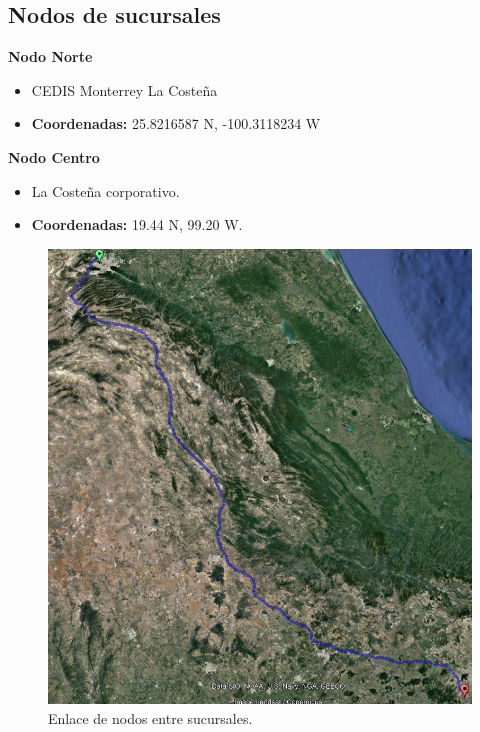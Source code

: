 \documentclass[12pt,letterpaper]{article}
\begin{document}
\newpage
\subsection{Nodos de sucursales}
\textbf{Nodo Norte}
\begin{itemize}
    \item CEDIS Monterrey La Costeña
    \item \textbf{Coordenadas: } 25.8216587 N, -100.3118234 W
\end{itemize}

\textbf{Nodo Centro}
\begin{itemize}
    \item La Costeña corporativo.
    \item \textbf{Coordenadas: } 19.44 N, 99.20 W.
\end{itemize}

\begin{figure}[ht]
    \centering
    \includegraphics[width=.7\textwidth]{imagenes/nodos.PNG}
    \caption{Enlace de nodos entre sucursales.}
\end{figure}

\newpage
\end{document}
